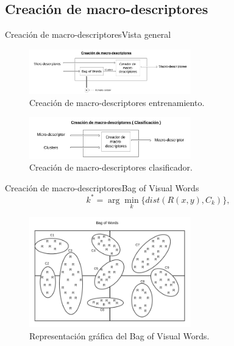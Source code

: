 \documentclass{beamer}
\begin{document}
    \subsection{Creación de macro-descriptores}
		\begin{frame}{Creación de macro-descriptores}{Vista general}
            \begin{figure}[bt]
        		\centering
                \includegraphics[width=7cm]{imagenes/Extractor_macrodescriptores_entrenamiento.png}
          		\caption{Creación de macro-descriptores entrenamiento.}
            \end{figure}
            
            \begin{figure}[bt]
        		\centering
                \includegraphics[width=7cm]{imagenes/Extractor_macrodescriptores_clasificacion.png}
          		\caption{Creación de macro-descriptores clasificador.}
            \end{figure}
        \end{frame}
        
        
        \begin{frame}{Creación de macro-descriptores}{Bag of Visual Words}
            \begin{equation}
  				\label{algoritmo:eq:dist}
				k^* = \arg \min_k \{\mathit{dist}(R(x,y),C_k)\},
			\end{equation}
            \begin{figure}[bt]
        		\centering
                \includegraphics[width=7cm]{imagenes/bow_solo.png}
          		\caption{Representación gráfica del Bag of Visual Words.}
            \end{figure}
        \end{frame}
        
\end{document}
